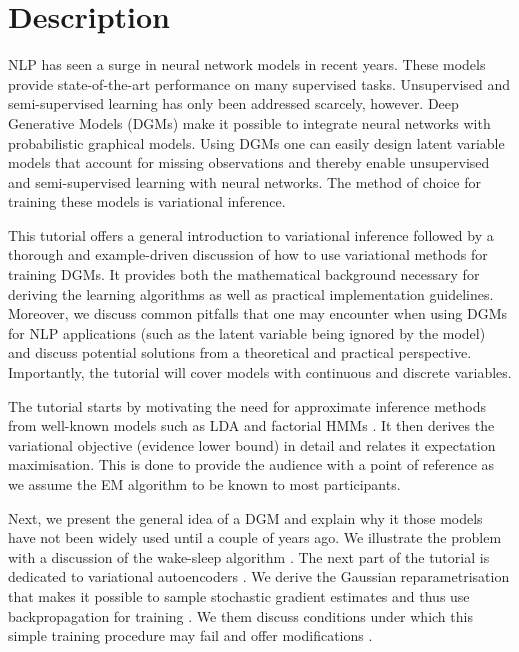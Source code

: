 \section{Description}

NLP has seen a surge in neural network models in recent years. These models provide state-of-the-art
performance on many supervised tasks. Unsupervised and semi-supervised learning has only been
addressed scarcely, however. Deep Generative Models (DGMs) make it possible to integrate neural networks
with probabilistic graphical models. Using DGMs one can easily design  latent variable models that
account for missing observations and thereby enable unsupervised and semi-supervised learning
with neural networks. The method of choice for training these models is variational inference.

This tutorial offers a general introduction to variational inference followed by a thorough and 
example-driven discussion of how to use variational methods for training DGMs. It provides both 
the mathematical background necessary for deriving the learning algorithms as well as practical
implementation guidelines. Moreover, we discuss common pitfalls that one may encounter when using
DGMs for NLP applications (such as the latent variable being ignored by the model) and discuss
potential solutions from a theoretical and practical perspective. Importantly, the tutorial
will cover models with continuous and discrete variables.

The tutorial starts by motivating the need for approximate inference methods from well-known models
such as LDA \citep{BleiEtAl:2003} and factorial HMMs \citep{GhahramaniJordan:1996}. It then derives the variational objective (evidence lower bound) in
detail and relates it expectation maximisation. This is done to provide the audience with
a point of reference as we assume the EM algorithm to be known to most participants.

Next, we present the general idea of a DGM and
explain why it those models have not been widely used until a couple of years ago. We illustrate
the problem with a discussion of the wake-sleep algorithm \citep{HintonEtAl:1995}. 
The next part of the tutorial
is dedicated to variational autoencoders \citep{KingmaWelling:2013, RezendeEtAl:2014}. We derive the Gaussian reparametrisation that makes
it possible to sample stochastic gradient estimates and thus use backpropagation for training
\citep{KingmaWelling:2013, RezendeEtAl:2014, TitsiasLazarogredilla:2014}.
We them discuss conditions under which this simple training procedure may fail and offer modifications
\cite[e.g. downscaling the KL-term of the variational objective][]{BowmanEtAl:2016}. 

